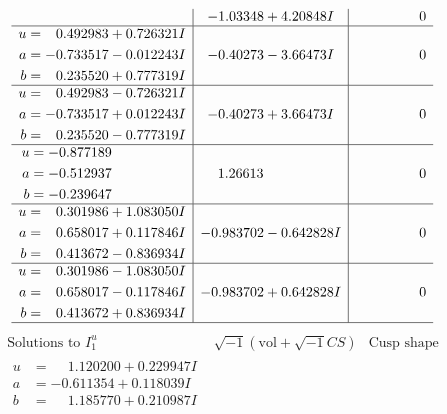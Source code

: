 \documentclass[1p]{elsarticle_modified}
\theoremstyle{definition}
\newcommand{\I}{\sqrt{-1}}
\begin{document}
$$\begin{array}{c|c|c}
 & -1.03348 + 4.20848 I & \phantom{-0.000000 } 0 \\ \hline\begin{aligned}
u &= \phantom{-}0.492983 + 0.726321 I \\
a &= -0.733517 - 0.012243 I \\
b &= \phantom{-}0.235520 + 0.777319 I\end{aligned}
 & -0.40273 - 3.66473 I & \phantom{-0.000000 } 0 \\ \hline\begin{aligned}
u &= \phantom{-}0.492983 - 0.726321 I \\
a &= -0.733517 + 0.012243 I \\
b &= \phantom{-}0.235520 - 0.777319 I\end{aligned}
 & -0.40273 + 3.66473 I & \phantom{-0.000000 } 0 \\ \hline\begin{aligned}
u &= -0.877189\phantom{ +0.000000I} \\
a &= -0.512937\phantom{ +0.000000I} \\
b &= -0.239647\phantom{ +0.000000I}\end{aligned}
 & \phantom{-}1.26613\phantom{ +0.000000I} & \phantom{-0.000000 } 0 \\ \hline\begin{aligned}
u &= \phantom{-}0.301986 + 1.083050 I \\
a &= \phantom{-}0.658017 + 0.117846 I \\
b &= \phantom{-}0.413672 - 0.836934 I\end{aligned}
 & -0.983702 - 0.642828 I & \phantom{-0.000000 } 0 \\ \hline\begin{aligned}
u &= \phantom{-}0.301986 - 1.083050 I \\
a &= \phantom{-}0.658017 - 0.117846 I \\
b &= \phantom{-}0.413672 + 0.836934 I\end{aligned}
 & -0.983702 + 0.642828 I & \phantom{-0.000000 } 0\\
 \hline 
 \end{array}$$\newpage$$\begin{array}{c|c|c}  
\text{Solutions to }I^u_{1}& \I (\text{vol} + \sqrt{-1}CS) & \text{Cusp shape}\\
 \hline 
\begin{aligned}
u &= \phantom{-}1.120200 + 0.229947 I \\
a &= -0.611354 + 0.118039 I \\
b &= \phantom{-}1.185770 + 0.210987 I\end{aligned}

\end{array}$$
\end{document}
